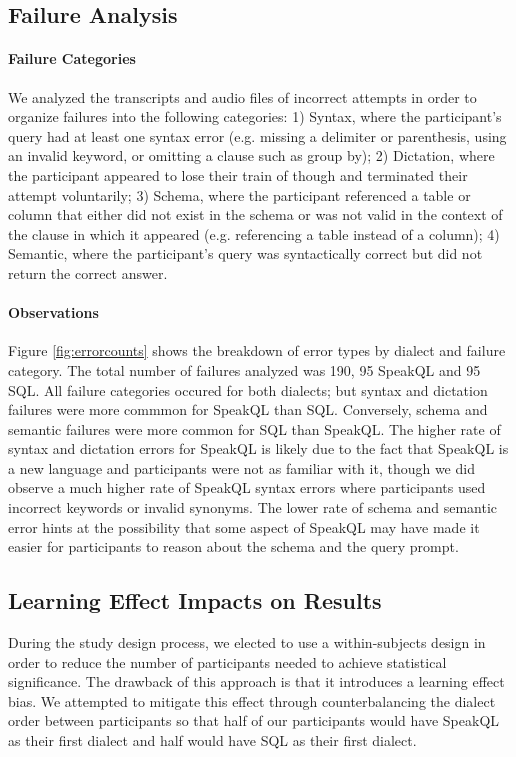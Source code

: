 \subsection{Failure Analysis} 

\paragraph{\textbf{Failure Categories}}
We analyzed the transcripts and audio files of incorrect attempts in order to organize failures into the following categories: 1) Syntax, where the participant's query had at least one syntax error (e.g. missing a delimiter or parenthesis, using an invalid keyword, or omitting a clause such as group by); 2) Dictation, where the participant appeared to lose their train of though and terminated their attempt voluntarily; 3) Schema, where the participant referenced a table or column that either did not exist in the schema or was not valid in the context of the clause in which it appeared (e.g. referencing a table instead of a column); 4) Semantic, where the participant's query was syntactically correct but did not return the correct answer.

\paragraph{\textbf{Observations}}
Figure \ref{fig:errorcounts} shows the breakdown of error types by dialect and failure category. The total number of failures analyzed was 190, 95 SpeakQL and 95 SQL. All failure categories occured for both dialects; but syntax and dictation failures were more commmon for SpeakQL than SQL. Conversely, schema and semantic failures were more common for SQL than SpeakQL. The higher rate of syntax and dictation errors for SpeakQL is likely due to the fact that SpeakQL is a new language and participants were not as familiar with it, though we did observe a much higher rate of SpeakQL syntax errors where participants used incorrect keywords or invalid synonyms. The lower rate of schema and semantic error hints at the possibility that some aspect of SpeakQL may have made it easier for participants to reason about the schema and the query prompt.

\subsection{Learning Effect Impacts on Results}
During the study design process, we elected to use a within-subjects design in order to reduce the number of participants needed to achieve statistical significance. 
The drawback of this approach is that it introduces a learning effect bias. 
We attempted to mitigate this effect through counterbalancing the dialect order between participants so that half of our participants would have SpeakQL as their first dialect and half would have SQL as their first dialect. 

